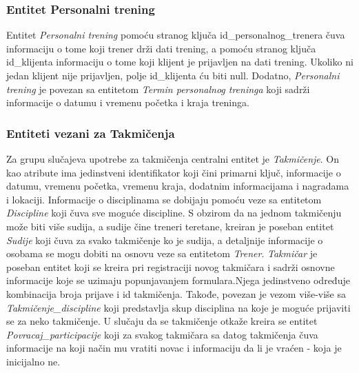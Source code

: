 \documentclass[../main.tex]{subfiles}
\begin{document}
\subsubsection{Entitet Personalni trening}

Entitet \textit{Personalni trening} pomoću stranog ključa id\_personalnog\_trenera  čuva informaciju o tome koji trener drži dati trening, a pomoću stranog ključa id\_klijenta informaciju o tome koji klijent je prijavljen na dati trening. Ukoliko ni jedan klijent nije prijavljen, polje id\_klijenta ću biti null. Dodatno, \textit{Personalni trening} je povezan sa entitetom \textit{Termin personalnog treninga} koji sadrži informacije o datumu i vremenu početka i kraja treninga. 


\subsubsection{Entiteti vezani za Takmičenja}

Za grupu slučajeva upotrebe za takmičenja centralni entitet je \textit{Takmičenje}. On kao atribute ima jedinstveni identifikator koji čini primarni ključ, informacije o datumu, vremenu početka, vremenu kraja, dodatnim informacijama i nagradama i lokaciji. Informacije o disciplinama se dobijaju pomoću veze sa entitetom \textit{Discipline} koji čuva sve moguće discipline. S obzirom da na jednom takmičenju može biti više sudija, a sudije čine treneri teretane, kreiran je poseban entitet \textit{Sudije} koji čuva za svako takmičenje ko je sudija, a detaljnije informacije o osobama se mogu dobiti na osnovu veze sa entitetom \textit{Trener}. \textit{Takmičar} je poseban entitet koji se kreira pri registraciji novog takmičara i sadrži osnovne informacije koje se uzimaju popunjavanjem formulara.Njega jedinstveno određuje kombinacija broja prijave i id takmičenja. Takođe, povezan je vezom više-više sa \textit{Takmičenje\_discipline} koji predstavlja skup disciplina na koje je moguće prijaviti se za neko takmičenje. U slučaju da se takmičenje otkaže kreira se entitet \textit{Povracaj\_participacije} koji za svakog takmičara sa datog takmičenja čuva informacije na koji način mu vratiti novac i informaciju da li je vraćen - koja je inicijalno ne. 
\end{document}
